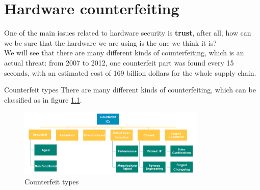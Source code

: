 \chapter{Hardware counterfeiting}
One of the main issues related to hardware security is \textbf{trust}, after all, how can we be sure 
that the hardware we are using is the one we think it is?\\
We will see that there are many different kinds of counterfeiting, which is an actual threat: from
2007 to 2012, one counterfeit part was found every 15 seconds, with an estimated cost of 169 billion
dollars for the whole supply chain.
\begin{section}{Counterfeit types}
  There are many different kinds of counterfeiting, which can be classified as in figure 
  \ref{fig:counterfeit-types}.
  \begin{figure}[H]
    \centering
    \includegraphics[width=0.8\textwidth]{img/hardware/counterfeit types.png}
    \caption{Counterfeit types}
    \label{fig:counterfeit-types}
  \end{figure}


\end{section}
